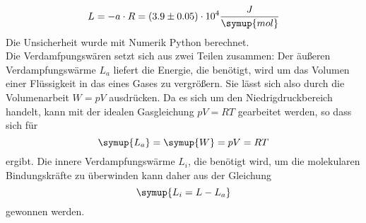   \begin{equation*}
    L= - a \cdot R = (3.9 \pm 0.05) \cdot 10^4 \dfrac{J}{\symup{mol}}
  \end{equation*}
  Die Unsicherheit wurde mit Numerik Python berechnet.\\
  Die Verdamfpungswären setzt sich aus zwei Teilen zusammen: Der äußeren Verdampfungswärme $L_a$
  liefert die Energie, die benötigt, wird um das Volumen einer Flüssigkeit in das eines 
  Gases zu vergrößern. Sie lässt sich also durch die Volumenarbeit $W = pV$ ausdrücken. Da es sich um 
  den Niedrigdruckbereich handelt, kann mit der idealen Gasgleichung $pV = RT$ gearbeitet 
  werden, so dass sich für 
  \begin{equation*}
  \symup{L_a} = \symup{W} = pV = RT
  \end{equation*}
  ergibt. Die innere Verdampfungswärme $L_i$, die benötigt wird, um die molekularen Bindungskräfte
  zu überwinden kann daher aus der Gleichung
  \begin{equation*}
  \symup{L_i = L - L_a}
  \end{equation*}
  gewonnen werden.

